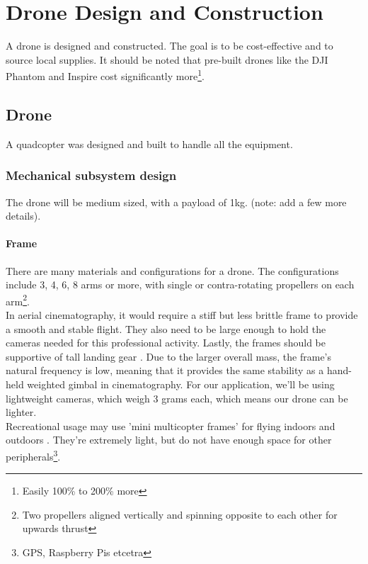 \chapter{Drone Design and Construction}

A drone is designed and constructed. The goal is to be cost-effective and to source local supplies. It should be noted that pre-built drones like the DJI Phantom and Inspire cost significantly more\footnote{Easily 100\% to 200\% more}.

\section{Drone}

A quadcopter was designed and built to handle all the equipment.

\subsection{Mechanical subsystem design}

The drone will be medium sized, with a payload of 1kg. (note: add a few more details).

\subsubsection{Frame}

There are many materials and configurations for a drone. The configurations include 3, 4, 6, 8 arms or more, with single or contra-rotating propellers on each arm\footnote{Two propellers aligned vertically and spinning opposite to each other for upwards thrust}. \\

In aerial cinematography, it would require a stiff but less brittle frame to provide a smooth and stable flight. They also need to be large enough to hold the cameras needed for this professional activity. Lastly, the frames should be supportive of tall landing gear \cite{frame}. Due to the larger overall mass, the frame's natural frequency is low, meaning that it provides the same stability as a hand-held weighted gimbal in cinematography. For our application, we'll be using lightweight cameras, which weigh 3 grams each, which means our drone can be lighter.\\

Recreational usage may use 'mini multicopter frames' for flying indoors and outdoors \cite{frame}. They're extremely light, but do not have enough space for other peripherals\footnote{GPS, Raspberry Pis etcetra}.\\

